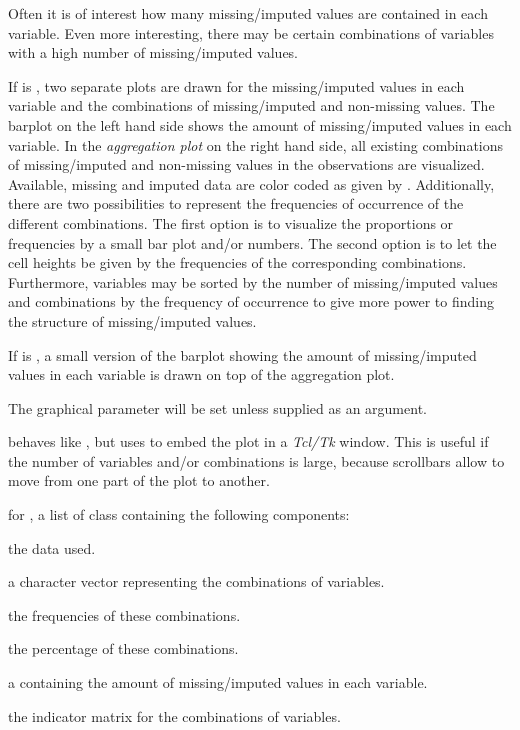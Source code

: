 %
\begin{Details}\relax
Often it is of interest how many missing/imputed values are contained in each 
variable.  Even more interesting, there may be certain combinations of 
variables with a high number of missing/imputed values.

If  is , two separate plots are drawn for the 
missing/imputed values in each variable and the combinations of missing/imputed and 
non-missing values. The barplot on the left hand side shows the amount of 
missing/imputed values in each variable.  In the \emph{aggregation plot} on the right 
hand side, all existing combinations of missing/imputed and non-missing values in 
the observations are visualized.  Available, missing and imputed data are color
coded as given by .  Additionally, there are two possibilities to 
represent the frequencies of occurrence of the different combinations.  The 
first option is to visualize the proportions or frequencies by a small bar 
plot and/or numbers.  The second option is to let the cell heights be given 
by the frequencies of the corresponding combinations. Furthermore, variables 
may be sorted by the number of missing/imputed values and combinations by the 
frequency of occurrence to give more power to finding the structure of 
missing/imputed values.

If  is , a small version of the barplot showing 
the amount of missing/imputed values in each variable is drawn on top of the 
aggregation plot.

The graphical parameter  will be set unless supplied as an 
argument.

 behaves like , but uses 
 to embed the plot in a \emph{Tcl/Tk} 
window.  This is useful if the number of variables and/or combinations 
is large, because scrollbars allow to move from one part of the plot 
to another.
\end{Details}
%
\begin{Value}
for , a list of class  containing the following 
components:
\begin{ldescription}
\item[\code{x}] the data used.
\item[\code{combinations}] a character vector representing the combinations of 
variables.
\item[\code{count}] the frequencies of these combinations.
\item[\code{percent}] the percentage of these combinations.
\item[\code{missings}] a  containing the amount of missing/imputed values 
in each variable.
\item[\code{tabcomb}] the indicator matrix for the combinations of variables.
\end{ldescription}
\end{Value}
